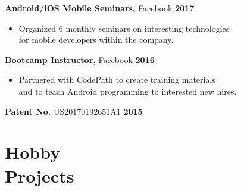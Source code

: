 \documentclass[sectioned]{dsyangres}
\begin{document}
\begin{resume}

\textbf{Android/iOS Mobile Seminars,} Facebook \hfill \textbf{2017}
  \begin{itemize} \itemsep -2pt
    \item Organized 6 monthly seminars on interesting technologies 
      \\ for mobile developers within the company.
  \end{itemize}
\textbf{Bootcamp Instructor,} Facebook \hfill \textbf{2016}
  \begin{itemize} \itemsep -2pt
    \item Partnered with CodePath to create training materials
       \\and to teach Android programming to interested new hires. 
    \end{itemize}

\textbf{Patent No.} US20170192651A1 \hfill \textbf{2015}






\section{Hobby \\ Projects}


\end{resume}
\end{document}

